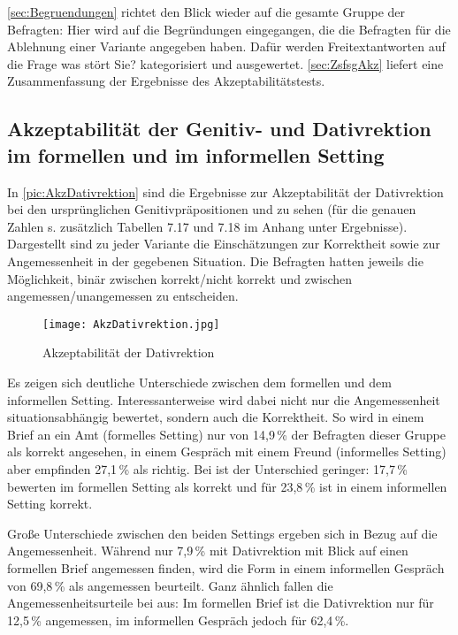 \autoref{sec:Begruendungen} richtet den Blick wieder auf die gesamte Gruppe der Befragten: 
Hier wird auf die Begründungen eingegangen, die die Befragten für die Ablehnung einer Variante angegeben haben. 
Dafür werden Freitextantworten auf die Frage \glqq was stört Sie?\grqq{} kategorisiert und ausgewertet. 
\autoref{sec:ZsfsgAkz} liefert eine Zusammenfassung der Ergebnisse des Akzeptabilitätstests. 
\subsection{Akzeptabilität der Genitiv- und Dativrektion im formellen und im informellen Setting} 
\label{sec:ErgAkzallg}
In \autoref{pic:AkzDativrektion} sind die Ergebnisse zur Akzeptabilität der Dativrektion bei den ursprünglichen Genitivpräpositionen \wegen{} und \waehrend{} zu sehen (für die genauen Zahlen s. zusätzlich Tabellen 7.17 und 7.18 im Anhang unter Ergebnisse). 
Dargestellt sind zu jeder Variante die Einschätzungen zur Korrektheit sowie zur Angemessenheit in der gegebenen Situation. 
Die Befragten hatten jeweils die Möglichkeit, binär zwischen \glqq korrekt\grqq /\glqq nicht korrekt\grqq{} und zwischen \glqq angemessen\grqq /\glqq unangemessen\grqq{} zu entscheiden. 

\begin{figure}
\centering
\texttt{[image: AkzDativrektion.jpg]}
\caption{Akzeptabilität der Dativrektion}
\label{pic:AkzDativrektion}
\end{figure}

Es zeigen sich deutliche Unterschiede zwischen dem formellen und dem informellen Setting. 
Interessanterweise wird dabei nicht nur die Angemessenheit situationsabhängig bewertet, sondern auch die Korrektheit. 
So wird  in einem Brief an ein Amt (formelles Setting) nur von 14,9\,\% der Befragten dieser Gruppe als korrekt angesehen, in einem Gespräch mit einem Freund (informelles Setting) aber empfinden 27,1\,\%  als richtig. 
Bei \waehrend{} ist der Unterschied geringer: 17,7\,\% bewerten  im formellen Setting als korrekt und für 23,8\,\% ist  in einem informellen Setting korrekt. 

Große Unterschiede zwischen den beiden Settings ergeben sich in Bezug auf die Angemessenheit. 
Während nur 7,9\,\% \wegen{} mit Dativrektion mit Blick auf einen formellen Brief angemessen finden, wird die Form in einem informellen Gespräch von 69,8\,\% als angemessen beurteilt. 
Ganz ähnlich fallen die Angemessenheitsurteile bei \waehrend{} aus: Im formellen Brief ist die Dativrektion nur für 12,5\,\% angemessen, im informellen Gespräch jedoch für 62,4\,\%. 

